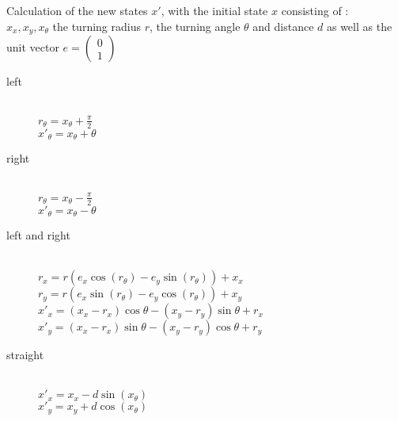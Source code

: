 Calculation of the new states $x'$, with the initial state $x$ consisting of :\\
$x_x, x_y, x_\theta$ the turning radius $r$, the turning angle $\theta$ and distance $d$ as well as the unit vector $e = \left(\begin{smallmatrix}0\\1\end{smallmatrix}\right)$
\begin{description}
  \item[left] \hfill \\
  $r_\theta = x_\theta + \frac{\pi}{2}$\\
  $x'_\theta = x_\theta + \theta$
  \item[right] \hfill \\
  $r_\theta = x_\theta - \frac{\pi}{2}$\\
  $x'_\theta = x_\theta - \theta$
  \item[left and right] \hfill\\
  $r_x = r(e_x\cos(r_\theta) - e_y\sin(r_\theta)) + x_x$\\
  $r_y = r(e_x\sin(r_\theta) - e_y\cos(r_\theta)) + x_y$\\
  $x'_x = (x_x-r_x)\cos\theta - (x_y-r_y)\sin\theta + r_x$\\
  $x'_y = (x_x-r_x)\sin\theta - (x_y-r_y)\cos\theta + r_y$
  \item[straight] \hfill \\
  $x'_x = x_x - d\sin(x_\theta)$\\
  $x'_y = x_y + d\cos(x_\theta)$
\end{description}